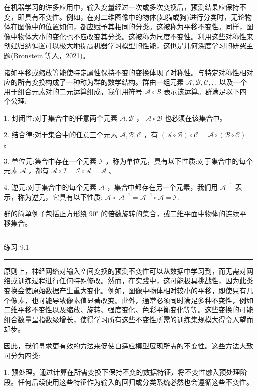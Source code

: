 \documentclass[10pt]{report}
\newcommand{\HRule}{\begin{center}\rule{0.9\linewidth}{0.2mm}\end{center}}
\begin{document}
在机器学习的许多应用中，输入变量经过一次或多次变换后，预测结果应保持不变，即具有不变性。例如，在对二维图像中的物体(如猫或狗)进行分类时，无论物体在图像中的位置如何，都应赋予其相同的分类。这被称为平移不变性。同样，图像中物体大小的变化也不应改变其分类。这被称为尺度不变性。利用这些对称性来创建归纳偏置可以极大地提高机器学习模型的性能，这也是几何深度学习的研究主题(Bronstein 等人，2021)。

诸如平移或缩放等能使特定属性保持不变的变换体现了对称性。与特定对称性相对应的所有变换构成了一种称为群的数学结构。群由一组元素 \(\mathcal{A},\mathcal{B},\mathcal{C},\ldots\) 以及一个用于组合元素对的二元运算组成，我们用符号 \(\mathcal{A} \circ  \mathcal{B}\) 表示该运算。群满足以下四个公理:

1. 封闭性:对于集合中的任意两个元素 \(\mathcal{A},\mathcal{B}\) ， \(\mathcal{A} \circ  \mathcal{B}\) 也必须在该集合中。

2. 结合律:对于集合中的任意三个元素 \(\mathcal{A},\mathcal{B},\mathcal{C}\) ，有 \(\left( {\mathcal{A} \circ  \mathcal{B}}\right)  \circ  \mathcal{C} = \mathcal{A} \circ  \left( {\mathcal{B} \circ  \mathcal{C}}\right)\) 。

3. 单位元:集合中存在一个元素 \(\mathcal{I}\) ，称为单位元，具有以下性质:对于集合中的每个元素 \(\mathcal{A}\) ，都有 \(\mathcal{A} \circ  \mathcal{I} = \mathcal{I} \circ  \mathcal{A} = \mathcal{A}\) 。

4. 逆元:对于集合中的每个元素 \(\mathcal{A}\) ，集合中都存在另一个元素，我们用 \({\mathcal{A}}^{-1}\) 表示，称为逆元，它具有以下性质: \(\mathcal{A} \circ\)  \({\mathcal{A}}^{-1} = {\mathcal{A}}^{-1} \circ  \mathcal{A} = \mathcal{I}.\)

群的简单例子包括正方形绕 \({90}^{ \circ  }\) 的倍数旋转的集合，或二维平面中物体的连续平移集合。

\HRule

练习 9.1

\HRule

原则上，神经网络对输入空间变换的预测不变性可以从数据中学习到，而无需对网络或训练过程进行任何特殊修改。然而，在实践中，这可能极具挑战性，因为此类变换会使原始数据产生重大变化。例如，图像中物体相对较小的平移，即使只有几个像素，也可能导致像素值显著改变。此外，通常必须同时满足多种不变性，例如二维平移不变性以及缩放、旋转、强度变化、色彩平衡变化等等。这些变换的可能组合数量呈指数级增长，使得学习所有这些不变性所需的训练集规模大得令人望而却步。

因此，我们寻求更有效的方法来促使自适应模型展现所需的不变性。这些方法大致可分为四类:

1. 预处理。通过计算在所需变换下保持不变的数据特征，将不变性融入预处理阶段。任何后续使用这些特征作为输入的回归或分类系统必然也会遵循这些不变性。
\end{document}
